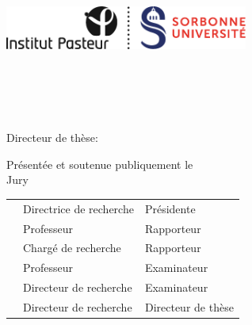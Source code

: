 %
%

\begin{titlepage}
	\thispagestyle{fancytitlepage}
	\tgherosfont
	\centering

	{\Huge \thesisUniversity} \\[2mm]
    {\Large \thesisUniversityDepartment} \\[2mm]
	\includegraphics[width=8cm]{FrontBackMatter/gfx/UPMC_Sorbonne_Universites_Logo} \\[2mm]	
	\textsf{\large \thesisUniversityGroup} \\
    \textsf{\large \thesisUniversityInstitute} \\

	\vfill
	{\large \thesisSubject} \\[10mm]
	{\LARGE \color{ctcolortitle}\textbf{\thesisTitle} \\[10mm]}
	{\Large \thesisName} \\[5mm]
    {\Large Directeur de thèse: \textbf{\thesisFirstSupervisor}}\\
    \vfill
    
    {\large Présentée et soutenue publiquement le \thesisDate }\\[5mm]
    {\large Jury}\\
	\begin{tabular}{>{\Large\bfseries}l>{\Large}l>{\Large}l}
		\thesisPresident & Directrice de recherche & Présidente\\
		\thesisFirstReviewer & Professeur & Rapporteur\\
		\thesisSecondReviewer & Chargé de recherche & Rapporteur\\
		\thesisFirstExaminer & Professeur & Examinateur\\
		\thesisSecondExaminer & Directeur de recherche & Examinateur\\
		\thesisFirstSupervisor & Directeur de recherche & Directeur de thèse\\
	\end{tabular}
\end{titlepage}


